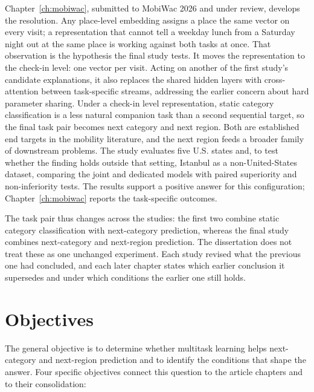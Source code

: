 Chapter~\ref{ch:mobiwac}, submitted to MobiWac 2026 and under review, develops the
resolution. Any place-level embedding assigns a place the same vector on every visit; a
representation that cannot tell a weekday lunch from a Saturday night out at the same
place is working against both tasks at once. That observation is the hypothesis the
final study tests. It moves the representation to the check-in level: one vector per
visit. Acting on another of the first study's candidate explanations, it also replaces
the shared hidden layers with cross-attention between task-specific streams, addressing
the earlier concern about hard parameter sharing. Under a check-in level representation, static
category classification is a less natural companion task than a second sequential target,
so the final task pair becomes next category and next region. Both are established end
targets in the mobility literature, and the next region feeds a broader family of
downstream problems.
The study evaluates five
U.S. states and, to test whether the finding holds outside that setting,
Istanbul as a non-United-States dataset, comparing the joint and dedicated models with
paired superiority and non-inferiority tests. The results support a positive answer for
this configuration; Chapter~\ref{ch:mobiwac} reports the task-specific outcomes.

The task pair thus changes across the studies: the first two combine static category
classification with next-category prediction, whereas the final study combines
next-category and next-region prediction. The dissertation does not treat these as one
unchanged experiment. Each study revised what the previous one had concluded, and each
later chapter states which earlier conclusion it supersedes and under which conditions
the earlier one still holds.


\section{Objectives}
\label{sec:intro:objectives}

The general objective is to determine whether multitask learning helps next-category
and next-region prediction and to identify the conditions that shape the answer. Four
specific objectives connect this question to the article chapters and to their
consolidation:

